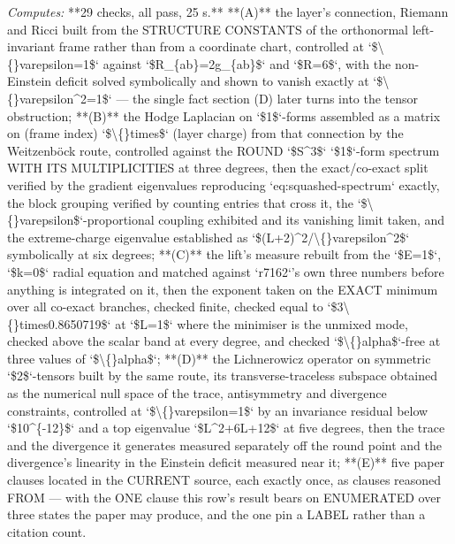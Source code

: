 \begin{description}
\emph{Computes:} **29 checks, all pass, 25 s.** **(A)** the layer's connection, Riemann and Ricci built from the STRUCTURE CONSTANTS of the orthonormal left-invariant frame rather than from a coordinate chart, controlled at `\$\textbackslash\{\}varepsilon=1\$` against `\$R\_\{ab\}=2g\_\{ab\}\$` and `\$R=6\$`, with the non-Einstein deficit solved symbolically and shown to vanish exactly at `\$\textbackslash\{\}varepsilon\textasciicircum{}2=1\$` --- the single fact section (D) later turns into the tensor obstruction; **(B)** the Hodge Laplacian on `\$1\$`-forms assembled as a matrix on (frame index) `\$\textbackslash\{\}times\$` (layer charge) from that connection by the Weitzenböck route, controlled against the ROUND `\$S\textasciicircum{}3\$` `\$1\$`-form spectrum WITH ITS MULTIPLICITIES at three degrees, then the exact/co-exact split verified by the gradient eigenvalues reproducing `eq:squashed-spectrum` exactly, the block grouping verified by counting entries that cross it, the `\$\textbackslash\{\}varepsilon\$`-proportional coupling exhibited and its vanishing limit taken, and the extreme-charge eigenvalue established as `\$(L+2)\textasciicircum{}2/\textbackslash\{\}varepsilon\textasciicircum{}2\$` symbolically at six degrees; **(C)** the lift's measure rebuilt from the `\$E=1\$`, `\$k=0\$` radial equation and matched against `r7162`'s own three numbers before anything is integrated on it, then the exponent taken on the EXACT minimum over all co-exact branches, checked finite, checked equal to `\$3\textbackslash\{\}times0.8650719\$` at `\$L=1\$` where the minimiser is the unmixed mode, checked above the scalar band at every degree, and checked `\$\textbackslash\{\}alpha\$`-free at three values of `\$\textbackslash\{\}alpha\$`; **(D)** the Lichnerowicz operator on symmetric `\$2\$`-tensors built by the same route, its transverse-traceless subspace obtained as the numerical null space of the trace, antisymmetry and divergence constraints, controlled at `\$\textbackslash\{\}varepsilon=1\$` by an invariance residual below `\$10\textasciicircum{}\{-12\}\$` and a top eigenvalue `\$L\textasciicircum{}2+6L+12\$` at five degrees, then the trace and the divergence it generates measured separately off the round point and the divergence's linearity in the Einstein deficit measured near it; **(E)** five paper clauses located in the CURRENT source, each exactly once, as clauses reasoned FROM --- with the ONE clause this row's result bears on ENUMERATED over three states the paper may produce, and the one pin a LABEL rather than a citation count.

\end{description}
